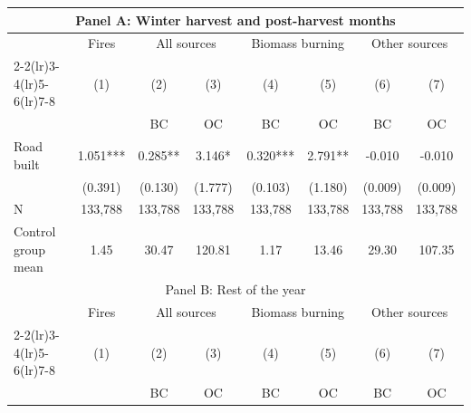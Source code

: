 \begin{table}[htbp] \centering
\def\sym#1{\ifmmode^{#1}\else\(^{#1}\)\fi}
\begin{tabular*}{1\textwidth}{@{\extracolsep{\fill}}l*{7}{c}}
\hline\hline
\multicolumn{8}{c}{Panel A: Winter harvest and post-harvest months}\\
\midrule
                         &\multicolumn{1}{c}{Fires}&\multicolumn{2}{c}{All sources}&\multicolumn{2}{c}{Biomass burning}&\multicolumn{2}{c}{Other sources}\\\cmidrule(lr){2-2}\cmidrule(lr){3-4}\cmidrule(lr){5-6}\cmidrule(lr){7-8}
                         &\multicolumn{1}{c}{(1)}&\multicolumn{1}{c}{(2)}&\multicolumn{1}{c}{(3)}&\multicolumn{1}{c}{(4)}&\multicolumn{1}{c}{(5)}&\multicolumn{1}{c}{(6)}&\multicolumn{1}{c}{(7)}\\
                         &\multicolumn{1}{c}{ }&\multicolumn{1}{c}{BC}&\multicolumn{1}{c}{OC}&\multicolumn{1}{c}{BC}&\multicolumn{1}{c}{OC}&\multicolumn{1}{c}{BC}&\multicolumn{1}{c}{OC}\\
\hline
Road built               &       1.051***&       0.285** &       3.146*  &       0.320***&       2.791** &      -0.010   &      -0.010   \\
                         &     (0.391)   &     (0.130)   &     (1.777)   &     (0.103)   &     (1.180)   &     (0.009)   &     (0.009)   \\
\hline
N                        &     133,788   &     133,788   &     133,788   &     133,788   &     133,788   &     133,788   &     133,788   \\
Control group mean       &        1.45   &       30.47   &      120.81   &        1.17   &       13.46   &       29.30   &      107.35   \\
\midrule
\multicolumn{8}{c}{Panel B: Rest of the year}\\
\midrule
                         &\multicolumn{1}{c}{Fires}&\multicolumn{2}{c}{All sources}&\multicolumn{2}{c}{Biomass burning}&\multicolumn{2}{c}{Other sources}\\\cmidrule(lr){2-2}\cmidrule(lr){3-4}\cmidrule(lr){5-6}\cmidrule(lr){7-8}
                         &\multicolumn{1}{c}{(1)}&\multicolumn{1}{c}{(2)}&\multicolumn{1}{c}{(3)}&\multicolumn{1}{c}{(4)}&\multicolumn{1}{c}{(5)}&\multicolumn{1}{c}{(6)}&\multicolumn{1}{c}{(7)}\\
                         &\multicolumn{1}{c}{ }&\multicolumn{1}{c}{BC}&\multicolumn{1}{c}{OC}&\multicolumn{1}{c}{BC}&\multicolumn{1}{c}{OC}&\multicolumn{1}{c}{BC}&\multicolumn{1}{c}{OC}\\

\end{tabular*}
\end{table}
